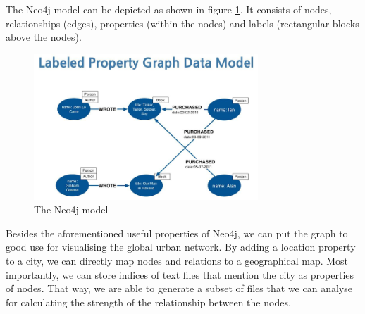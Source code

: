 The Neo4j model can be depicted as shown in figure \ref{fig:neo4j}. It consists of nodes, relationships (edges), properties (within the nodes) and labels (rectangular blocks above the nodes).

\begin{figure}
\centering
\includegraphics[width=0.75\textwidth]{neo4j}
\caption{The Neo4j model}
\label{fig:neo4j}
\end{figure}

Besides the aforementioned useful properties of Neo4j, we can put the graph to good use for visualising the global urban network. By adding a location property to a city, we can directly map nodes and relations to a geographical map. Most importantly, we can store indices of text files that mention the city as properties of nodes. That way, we are able to generate a subset of files that we can analyse for calculating the strength of the relationship between the nodes.









